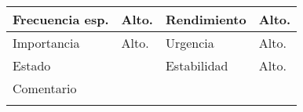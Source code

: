 \documentclass{article}
\begin{document}
\begin{table}[h]
\begin{tabular}{|l|l|l|l|l|l|}
\hline
\multicolumn{1}{|p{2cm}|}{Frecuencia esp.} & \multicolumn{2}{p{3cm}}{Alto.} & \multicolumn{1}{|p{2cm}|}{Rendimiento} & \multicolumn{2}{p{3cm}|}{Alto.}\\
\hline
\multicolumn{1}{|p{2cm}|}{Importancia} & \multicolumn{2}{p{3cm}}{Alto.} & \multicolumn{1}{|p{2cm}|}{Urgencia} & \multicolumn{2}{p{3cm}|}{Alto.}\\
\hline
\multicolumn{1}{|p{2cm}|}{Estado} & \multicolumn{2}{p{3cm}}{} & \multicolumn{1}{|p{2cm}|}{Estabilidad} & \multicolumn{2}{p{3cm}|}{Alto.}\\
\hline
\multicolumn{6}{|p{10cm}|}{Comentario}\\
\hline
\multicolumn{6}{|p{10cm}|}{}\\
\hline
\end{tabular}
\end{table}
\end{document}
